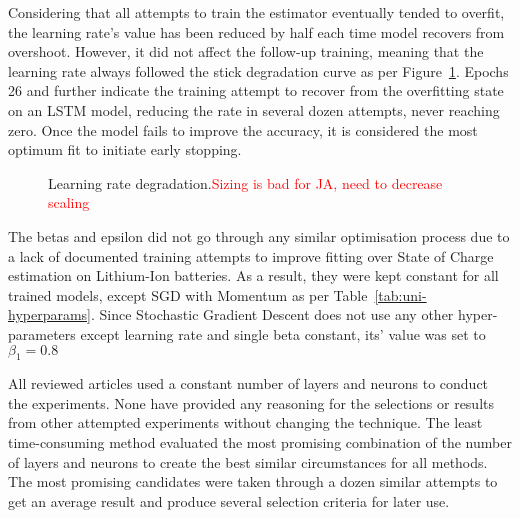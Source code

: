 Considering that all attempts to train the estimator eventually tended to overfit, the learning rate's value has been reduced by half each time model recovers from overshoot.
However, it did not affect the follow-up training, meaning that the learning rate always followed the stick degradation curve as per Figure~\ref{fig:l_rate_progress}.
Epochs 26 and further indicate the training attempt to recover from the overfitting state on an LSTM model, reducing the rate in several dozen attempts, never reaching zero.
Once the model fails to improve the accuracy, it is considered the most optimum fit to initiate early stopping.
\begin{figure}[ht]
    \centering
    
    \caption{Learning rate degradation.\textcolor{red}{Sizing is bad for JA, need to decrease scaling}}
    \label{fig:l_rate_progress}
\end{figure}

%
The betas and epsilon did not go through any similar optimisation process due to a lack of documented training attempts to improve fitting over State of Charge estimation on Lithium-Ion batteries.
As a result, they were kept constant for all trained models, except SGD with Momentum as per \mbox{Table~\ref{tab:uni-hyperparams}}.
Since Stochastic Gradient Descent does not use any other hyper-parameters except learning rate and single beta constant, its' value was set to $\beta_1 = 0.8$
\begin{table}[htbp]
  \renewcommand{\arraystretch}{1.3}
  \caption{Optimisers Hyper-Parameters}
  \centering
  \label{tab:uni-hyperparams}
\end{table}

%
All reviewed articles used a constant number of layers and neurons to conduct the experiments.
None have provided any reasoning for the selections or results from other attempted experiments without changing the technique.
The least time-consuming method evaluated the most promising combination of the number of layers and neurons to create the best similar circumstances for all methods.
The most promising candidates were taken through a dozen similar attempts to get an average result and produce several selection criteria for later use.


